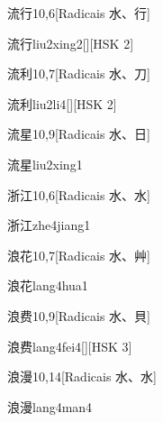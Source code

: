 \begin{entry}{流行}{10,6}[Radicais ⽔、⾏]
  \begin{phonetics}{流行}{liu2xing2}[][HSK 2]
  \end{phonetics}
\end{entry}

\begin{entry}{流利}{10,7}[Radicais ⽔、⼑]
  \begin{phonetics}{流利}{liu2li4}[][HSK 2]
  \end{phonetics}
\end{entry}

\begin{entry}{流星}{10,9}[Radicais ⽔、⽇]
  \begin{phonetics}{流星}{liu2xing1}
  \end{phonetics}
\end{entry}

\begin{entry}{浙江}{10,6}[Radicais ⽔、⽔]
  \begin{phonetics}{浙江}{zhe4jiang1}
  \end{phonetics}
\end{entry}

\begin{entry}{浪花}{10,7}[Radicais ⽔、⾋]
  \begin{phonetics}{浪花}{lang4hua1}
  \end{phonetics}
\end{entry}

\begin{entry}{浪费}{10,9}[Radicais ⽔、⾙]
  \begin{phonetics}{浪费}{lang4fei4}[][HSK 3]
  \end{phonetics}
\end{entry}

\begin{entry}{浪漫}{10,14}[Radicais ⽔、⽔]
  \begin{phonetics}{浪漫}{lang4man4}
  \end{phonetics}
\end{entry}

